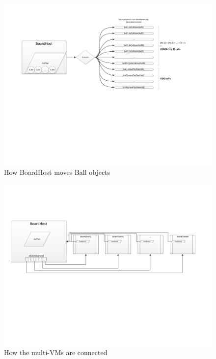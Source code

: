 \documentclass[11pt]{article}
\begin{document}
\begin{figure}
	\begin{center}
		\includegraphics[viewport = 68 287 692 557, width=\textwidth]{fig1.pdf}
	\end{center}
	\caption{How BoardHost moves Ball objects}
	\label{fig1}
\end{figure}

\begin{figure}
	\begin{center}
		\includegraphics[viewport = 26 274 730 493, width=\textwidth]{fig2a.pdf}
	\end{center}
	\caption{How the multi-VMs are connected}
	\label{fig2a}
\end{figure}
\end{document}
